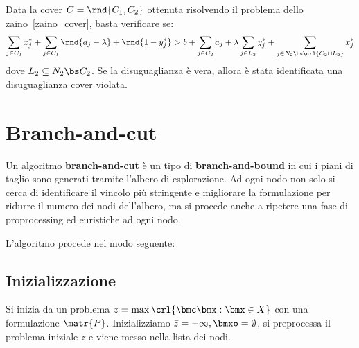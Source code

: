 \documentclass[\main/main.tex]{subfiles}
\begin{document}
Data la cover \(C = \rnd{C_1, C_2}\) ottenuta risolvendo il problema dello zaino~\ref{zaino_cover}, basta verificare se:
\[
    \sum_{j \in C_1} x^*_j + \sum_{j \in C_1} \rnd{a_j - \lambda}+\rnd{1-y^*_j} > b + \sum_{j \in C_2} a_j + \lambda \sum_{j \in L_2}y^*_j + \sum_{j \in N_2 \bs \crl{C_2 \cup L_2}}x^*_j
\]
dove \(L_2 \subseteq N_2 \bs C_2\). Se la disuguaglianza è vera, allora è stata identificata una disuguaglianza cover violata.

\clearpage
\section{Branch-and-cut}
Un algoritmo \textbf{branch-and-cut} è un tipo di \textbf{branch-and-bound} in cui i piani di taglio sono generati tramite l'albero di esplorazione. Ad ogni nodo non solo si cerca di identificare il vincolo più stringente e migliorare la formulazione per ridurre il numero dei nodi dell'albero, ma si procede anche a ripetere una fase di proprocessing ed euristiche ad ogni nodo.

L'algoritmo procede nel modo seguente:

\subsection{Inizializzazione}
Si inizia da un problema \(z = \max\crl{\bmc\bmx: \bmx \in X}\) con una formulazione \(\matr{P}\). Inizializziamo \(\bar{z} = -\infty, \bmxo = \emptyset \), si preprocessa il problema iniziale \(z\) e viene messo nella lista dei nodi.
\end{document}
